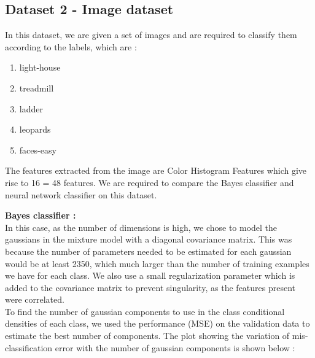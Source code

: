 \documentclass{article}
\begin{document}
\newpage

\subsection{Dataset 2 - Image dataset}
In this dataset, we are given a set of images and are required to classify them according to the labels, which are  :


\begin{enumerate}

\item    light-house

\item    treadmill

\item    ladder

\item    leopards

\item    faces-easy


\end{enumerate}

The features extracted from the image are Color Histogram Features which give rise to 16  = 48 features.  We are required to compare the Bayes classifier and neural network classifier on this dataset.


\begin{flushleft}

\textbf{Bayes classifier :} \\[10pt]

In this case, as the number of dimensions is high, we chose to model the gaussians in the  mixture model with a diagonal covariance matrix. This was because the number of parameters needed to be estimated for each gaussian would be at least 2350, which much larger than the number of training examples we have for each class. We also use a small regularization parameter which is added to the covariance matrix to prevent singularity, as the features present were correlated. \\[10pt]


To find the number of gaussian components to use in the class conditional densities of each class, we used the performance (MSE) on the validation data to estimate the best number of components. The plot showing the variation of mis-classification error with the number of gaussian components is shown below :

\end{flushleft}
\end{document}

